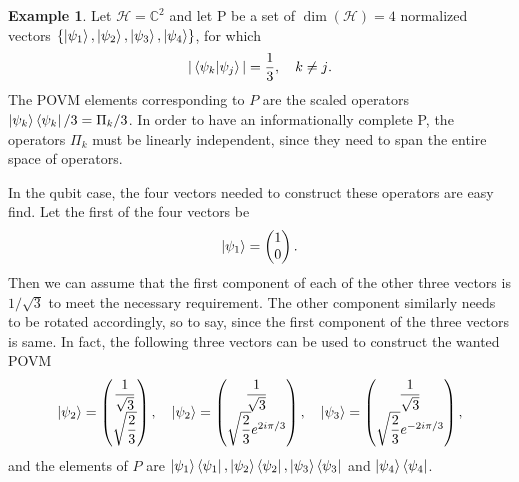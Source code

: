 \documentclass[a4paper,12pt]{wihuri}
\theoremstyle{definition}
\newtheorem{example}{Example}
\numberwithin{definition}{section}
\numberwithin{example}{section}
\numberwithin{theorem}{section}
\numberwithin{proposition}{section}
\numberwithin{lemma}{section}
\newcommand{\hi}{\mathcal{H}}%
\begin{document}
\begin{example}
Let $\hi = \mathbb{C}^2$ and let P be a set of $\dim (\hi) = 4$ normalized vectors $\lbrace \ket{\psi_1}, \ket{\psi_2}, \ket{\psi_3}, \ket{\psi_4} \rbrace$, for which
\begin{align*}
|\braket{\psi_k | \psi_j }| = \dfrac{1}{3},\quad k \neq j\text.
\end{align*}
The POVM elements corresponding to $P$ are the scaled operators $\ket{\psi_k}\bra{\psi_k}/3 = \Pi_k/3$. In order to have an informationally complete P, the operators $\Pi_k$ must be linearly independent, since they need to span the entire space of operators.\cite{sic_povm}  

In the qubit case, the four vectors needed to construct these operators are easy find. Let the first of the four vectors be 
\begin{align*}
\ket{\psi_1} = \begin{pmatrix}
1\\
0
\end{pmatrix}\text.
\end{align*}
Then we can assume that the first component of each of the other three vectors is $1/\sqrt{3}$ to meet the necessary requirement. The other component similarly needs to be rotated accordingly, so to say, since the first component of the three vectors is same. In fact, the following three vectors can be used to construct the wanted POVM
\begin{align*}
\ket{\psi_2} = \begin{pmatrix}
\dfrac{1}{\sqrt{3}}\\
\sqrt{\dfrac{2}{3}}
\end{pmatrix},\quad \ket{\psi_2} = \begin{pmatrix}
\dfrac{1}{\sqrt{3}}\\
\sqrt{\dfrac{2}{3}}e^{2i\pi/3}
\end{pmatrix},\quad \ket{\psi_3} = \begin{pmatrix}
\dfrac{1}{\sqrt{3}}\\
\sqrt{\dfrac{2}{3}}e^{-2i\pi/3}
\end{pmatrix},
\end{align*}
and the elements of $P$ are $\ket{\psi_1}\bra{\psi_1}, \ket{\psi_2}\bra{\psi_2}, \ket{\psi_3}\bra{\psi_3}$ and $\ket{\psi_4}\bra{\psi_4}$.




\end{example}
\end{document}
